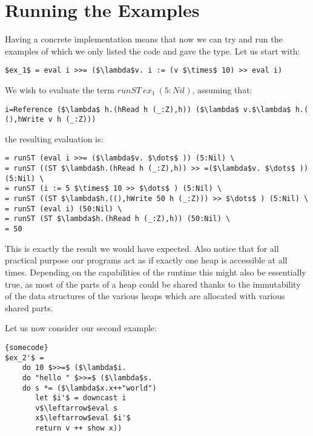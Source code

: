 \documentclass[a4paper]{article}
\begin{document}

\noindent 
\section{Running the Examples}

\noindent Having a concrete implementation means that now we can try and run the examples of which we only listed the code and gave the type. Let us start with:

\begin{lstlisting}
$ex_1$ = eval i >>= ($\lambda$v. i := (v $\times$ 10) >> eval i)
\end{lstlisting}

We wish to evaluate the term $runST\ ex_1\ (5:Nil)$, assuming that:

\begin{lstlisting}
i=Reference ($\lambda$ h.(hRead h (_:Z),h)) ($\lambda$ v.$\lambda$ h.( (),hWrite v h (_:Z)))
\end{lstlisting}

the resulting evaluation is:

\begin{lstlisting}
= runST (eval i >>= ($\lambda$v. $\dots$ )) (5:Nil) \ 
= runST ((ST $\lambda$h.(hRead h (_:Z),h)) >> =($\lambda$v. $\dots$ )) (5:Nil) \ 
= runST (i := 5 $\times$ 10 >> $\dots$ ) (5:Nil) \ 
= runST ((ST $\lambda$h.((),hWrite 50 h (_:Z))) >> $\dots$ ) (5:Nil) \ 
= runST (eval i) (50:Nil) \ 
= runST (ST $\lambda$h.(hRead h (_:Z),h)) (50:Nil) \ 
= 50
\end{lstlisting}

This is exactly the result we would have expected. Also notice that for all practical purpose our programs act as if exactly one heap is accessible at all times. Depending on the capabilities of the runtime this might also be essentially true, as most of the parts of a heap could be shared thanks to the immutability of the data structures of the various heaps which are allocated with various shared parts.

\noindent Let us now consider our second example:

\begin{lstlisting}[frame=tb,mathescape]{somecode}
$ex_2'$ =
	do 10 $>>=$ ($\lambda$i.
	do "hello " $>>=$ ($\lambda$s.
	do s *= ($\lambda$x.x++"world")
	   let $i'$ = downcast i
	   v$\leftarrow$eval s
	   x$\leftarrow$eval $i'$
	   return v ++ show x))
\end{lstlisting}
\end{document}
